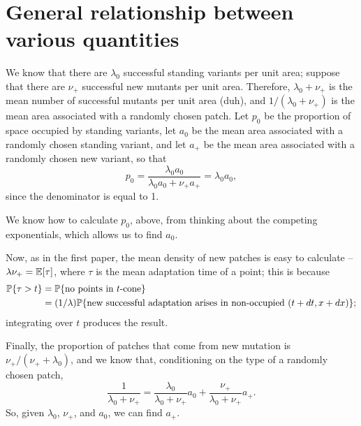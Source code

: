 \documentclass{article}
\begin{document}
\section{General relationship between various quantities}

We know that there are $\lambda_0$ successful standing variants per unit area;
suppose that there are $\nu_+$ successful new mutants per unit area.
Therefore, $\lambda_0+\nu_+$ is the mean number of successful mutants per unit area (duh),
and $1/(\lambda_0+\nu_+)$ is the mean area associated with a randomly chosen patch.
Let $p_0$ be the proportion of space occupied by standing variants, 
let $a_0$ be the mean area associated with a randomly chosen standing variant,
and let $a_+$ be the mean area associated with a randomly chosen new variant,
so that
\[
    p_0 = \frac{ \lambda_0 a_0 }{ \lambda_0 a_0 + \nu_+ a_+ } = \lambda_0 a_0 ,
\]
since the denominator is equal to 1.

We know how to calculate $p_0$, above, from thinking about the competing exponentials,
which allows us to find $a_0$.

Now, as in the first paper, the mean density of new patches is easy to calculate -- 
$\lambda \nu_+ = \E[\tau]$, where $\tau$ is the mean adaptation time of a point;
this is because 
\begin{align*}
    \P\{ \tau > t \} &= \P\{ \mbox{no points in $t$-cone} \} \\
            &= (1/\lambda) \P\{ \mbox{new successful adaptation arises in non-occupied $(t+dt,x+dx)$} \} ;
\end{align*}
integrating over $t$ produces the result.

Finally, the proportion of patches that come from new mutation is $\nu_+ / (\nu_+ + \lambda_0)$,
and we know that, conditioning on the type of a randomly chosen patch,
\[
    \frac{1}{\lambda_0+\nu_+} = \frac{\lambda_0}{\lambda_0+\nu_+} a_0 + \frac{\nu_+}{\lambda_0+\nu_+} a_+ .
\]
So, given $\lambda_0$, $\nu_+$, and $a_0$, we can find $a_+$.
\end{document}
